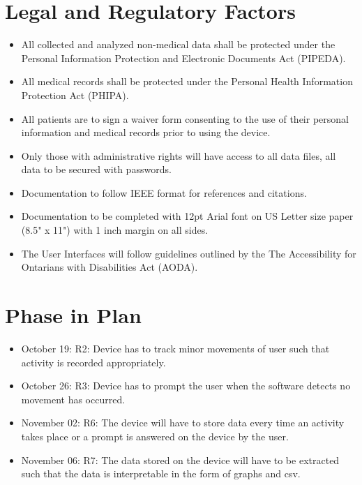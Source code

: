 \documentclass[12pt]{article}
\begin{document}
\section{Legal and Regulatory Factors}
\label{Legal}

\begin{itemize}
	\item All collected and analyzed non-medical data shall be protected under the Personal Information Protection and Electronic Documents Act (PIPEDA).
	\item All medical records shall be protected under the Personal Health Information Protection Act (PHIPA).
	\item All patients are to sign a waiver form consenting to the use of their personal information and medical records prior to using the device.
	\item Only those with administrative rights will have access to all data files, all data to be secured with passwords.
	\item Documentation to follow IEEE format for references and citations.
	\item Documentation to be completed with 12pt Arial font on US Letter size paper (8.5" x 11") with 1 inch margin on all sides.
	\item The User Interfaces will follow guidelines outlined by the The Accessibility for Ontarians with Disabilities Act (AODA).
\end{itemize}

\section{Phase in Plan}
\label{Phase_In}

\begin{itemize}
\item October 19: R2: Device has to track minor movements of user such that activity is recorded appropriately.\\
\item October 26: R3: Device has to prompt the user when the software detects no movement has occurred.\\
\item November 02:  R6: The device will have to store data every time an activity takes place or a prompt is answered on the device by the user.\\
\item November 06:  R7: The data stored on the device will have to be extracted such that the data is interpretable in the form of graphs and csv.\\
\end{itemize}
\newpage
\end{document}
